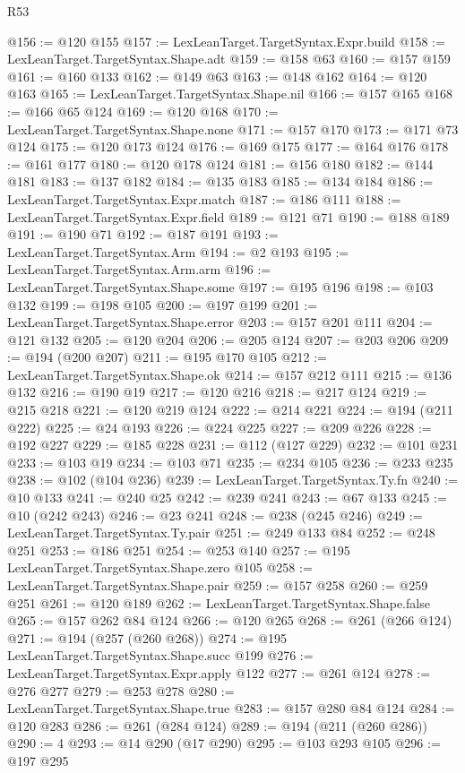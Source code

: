 \begin{lexlean}{R53}
\begin{coremodule}
@156 := @120 @155
@157 := LexLeanTarget.TargetSyntax.Expr.build
@158 := LexLeanTarget.TargetSyntax.Shape.adt
@159 := @158 @63
@160 := @157 @159
@161 := @160 @133
@162 := @149 @63
@163 := @148 @162
@164 := @120 @163
@165 := LexLeanTarget.TargetSyntax.Shape.nil
@166 := @157 @165
@168 := @166 @65 @124
@169 := @120 @168
@170 := LexLeanTarget.TargetSyntax.Shape.none
@171 := @157 @170
@173 := @171 @73 @124
@175 := @120 @173 @124
@176 := @169 @175
@177 := @164 @176
@178 := @161 @177
@180 := @120 @178 @124
@181 := @156 @180
@182 := @144 @181
@183 := @137 @182
@184 := @135 @183
@185 := @134 @184
@186 := LexLeanTarget.TargetSyntax.Expr.match
@187 := @186 @111
@188 := LexLeanTarget.TargetSyntax.Expr.field
@189 := @121 @71
@190 := @188 @189
@191 := @190 @71
@192 := @187 @191
@193 := LexLeanTarget.TargetSyntax.Arm
@194 := @2 @193
@195 := LexLeanTarget.TargetSyntax.Arm.arm
@196 := LexLeanTarget.TargetSyntax.Shape.some
@197 := @195 @196
@198 := @103 @132
@199 := @198 @105
@200 := @197 @199
@201 := LexLeanTarget.TargetSyntax.Shape.error
@203 := @157 @201 @111
@204 := @121 @132
@205 := @120 @204
@206 := @205 @124
@207 := @203 @206
@209 := @194 (@200 @207)
@211 := @195 @170 @105
@212 := LexLeanTarget.TargetSyntax.Shape.ok
@214 := @157 @212 @111
@215 := @136 @132
@216 := @190 @19
@217 := @120 @216
@218 := @217 @124
@219 := @215 @218
@221 := @120 @219 @124
@222 := @214 @221
@224 := @194 (@211 @222)
@225 := @24 @193
@226 := @224 @225
@227 := @209 @226
@228 := @192 @227
@229 := @185 @228
@231 := @112 (@127 @229)
@232 := @101 @231
@233 := @103 @19
@234 := @103 @71
@235 := @234 @105
@236 := @233 @235
@238 := @102 (@104 @236)
@239 := LexLeanTarget.TargetSyntax.Ty.fn
@240 := @10 @133
@241 := @240 @25
@242 := @239 @241
@243 := @67 @133
@245 := @10 (@242 @243)
@246 := @23 @241
@248 := @238 (@245 @246)
@249 := LexLeanTarget.TargetSyntax.Ty.pair
@251 := @249 @133 @84
@252 := @248 @251
@253 := @186 @251
@254 := @253 @140
@257 := @195 LexLeanTarget.TargetSyntax.Shape.zero @105
@258 := LexLeanTarget.TargetSyntax.Shape.pair
@259 := @157 @258
@260 := @259 @251
@261 := @120 @189
@262 := LexLeanTarget.TargetSyntax.Shape.false
@265 := @157 @262 @84 @124
@266 := @120 @265
@268 := @261 (@266 @124)
@271 := @194 (@257 (@260 @268))
@274 := @195 LexLeanTarget.TargetSyntax.Shape.succ @199
@276 := LexLeanTarget.TargetSyntax.Expr.apply @122
@277 := @261 @124
@278 := @276 @277
@279 := @253 @278
@280 := LexLeanTarget.TargetSyntax.Shape.true
@283 := @157 @280 @84 @124
@284 := @120 @283
@286 := @261 (@284 @124)
@289 := @194 (@211 (@260 @286))
@290 := 4
@293 := @14 @290 (@17 @290)
@295 := @103 @293 @105
@296 := @197 @295

\end{coremodule}
\end{lexlean}
